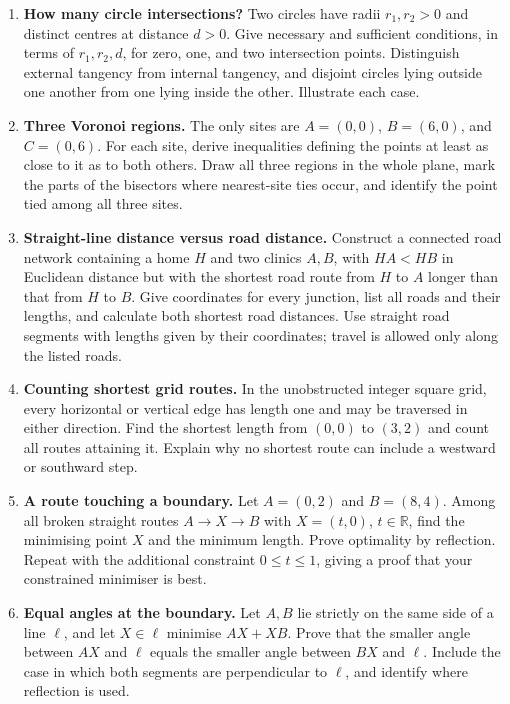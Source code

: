 \begin{enumerate}
\item \textbf{How many circle intersections?} Two circles have radii
$r_1,r_2>0$ and distinct centres at distance $d>0$. Give necessary and
sufficient conditions, in terms of $r_1,r_2,d$, for zero, one, and two
intersection points. Distinguish external tangency from internal tangency,
and disjoint circles lying outside one another from one lying inside the other.
Illustrate each case.

\item \textbf{Three Voronoi regions.} The only sites are $A=(0,0)$,
$B=(6,0)$, and $C=(0,6)$. For each site, derive inequalities defining the
points at least as close to it as to both others. Draw all three regions
in the whole plane, mark the parts of the bisectors where nearest-site ties
occur, and identify the point tied among all three sites.

\item \textbf{Straight-line distance versus road distance.} Construct a
connected road network containing a home $H$ and two clinics $A,B$, with
$HA<HB$ in Euclidean distance but with the shortest road route from $H$
to $A$ longer than that from $H$ to $B$. Give coordinates for every junction,
list all roads and their lengths, and calculate both shortest road distances.
Use straight road segments with lengths given by their coordinates; travel
is allowed only along the listed roads.

\item \textbf{Counting shortest grid routes.} In the unobstructed integer
square grid, every horizontal or vertical edge has length one and may be
traversed in either direction. Find the shortest length from $(0,0)$ to
$(3,2)$ and count all routes attaining it. Explain why no shortest route
can include a westward or southward step.

\item \textbf{A route touching a boundary.} Let $A=(0,2)$ and $B=(8,4)$.
Among all broken straight routes $A\!\to X\!\to B$ with $X=(t,0)$,
$t\in\mathbb R$, find the minimising point $X$ and the minimum length.
Prove optimality by reflection. Repeat with the additional constraint
$0\leq t\leq1$, giving a proof that your constrained minimiser is best.

\item \textbf{Equal angles at the boundary.} Let $A,B$ lie strictly on
the same side of a line $\ell$, and let $X\in\ell$ minimise $AX+XB$.
Prove that the smaller angle between $AX$ and $\ell$ equals the smaller
angle between $BX$ and $\ell$. Include the case in which both segments
are perpendicular to $\ell$, and identify where reflection is used.


\end{enumerate}
